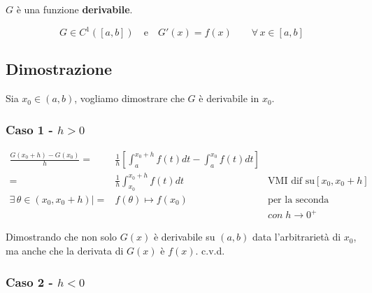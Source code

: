 \documentclass[../dimostrazioni]{subfiles}
\begin{document}
                        \(G\) è una funzione \textbf{derivabile}.

                        \[G \in C^{1}([a, b]) \quad \text{e} \quad G'(x) = f(x) \qquad \forall \, x \in [a,b] \]
        
                    \subsection*{Dimostrazione}

                        Sia \(x_0 \in (a,b) \), vogliamo dimostrare che \(G\) è derivabile in \(x_0\).

                        \subsubsection*{Caso 1 - \(h>0\)}

                            \begin{align*}
                                \frac{G(x_0+h) - G(x_0)}{h} =& \frac{1}{h} \left[ \int_{a}^{x_0+h} f(t) dt - \int_{a}^{x_0} f(t)dt \right] \\
                                                            =& \frac{1}{h} \int_{x_0}^{x_0+h}f(t) dt & \text{VMI dif su} [x_0, {x_0} +h]\\
                                \exists \, \theta \in (x_0, x_0+h) | =& f(\theta) \longmapsto f(x_0)          & \text{per la seconda proprietà del VMI}& \\
                                &                            &  con \; h \rightarrow 0^{+}&
                            \end{align*}
                            
                            Dimostrando che non solo \(G(x)\) è derivabile su \((a,b)\) data l'arbitrarietà di \(x_0\), 
                            ma anche che la derivata di \(G(x)\) è \(f(x)\). c.v.d.

                        \subsubsection*{Caso 2 - \(h<0\)}
\end{document}
